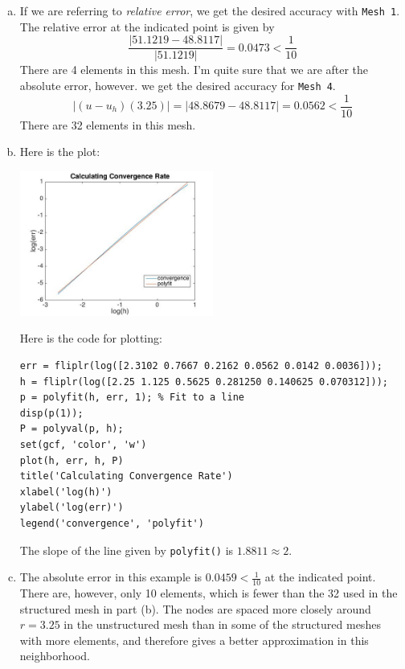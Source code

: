 \documentclass[11pt]{article}
\begin{document}
\begin{enumerate}[(a)]
\item If we are referring to \emph{relative error}, we get the desired accuracy with \texttt{Mesh 1}. The relative error at the indicated point is given by 
\begin{equation*}
\frac{|51.1219 - 48.8117|}{|51.1219|} = 0.0473 < \frac1{10}
\end{equation*}
There are 4 elements in this mesh. I'm quite sure that we are after the absolute error, however. we get the desired accuracy for \texttt{Mesh 4}.
\begin{equation*}
|(u - u_h)(3.25)| = |48.8679 - 48.8117| = 0.0562 < \frac1{10}
\end{equation*}
There are 32 elements in this mesh.
\item Here is the plot:
\begin{center}
\includegraphics[width=0.5\textwidth]{prob12b.jpg}
\end{center}
Here is the code for plotting:
\begin{lstlisting}
err = fliplr(log([2.3102 0.7667 0.2162 0.0562 0.0142 0.0036]));
h = fliplr(log([2.25 1.125 0.5625 0.281250 0.140625 0.070312]));
p = polyfit(h, err, 1); % Fit to a line
disp(p(1));
P = polyval(p, h);
set(gcf, 'color', 'w')
plot(h, err, h, P)
title('Calculating Convergence Rate')
xlabel('log(h)')
ylabel('log(err)')
legend('convergence', 'polyfit')
\end{lstlisting}

The slope of the line given by \texttt{polyfit()} is $1.8811 \approx 2$.	

\item The absolute error in this example is $0.0459 < \frac1{10}$ at the indicated point. There are, however, only 10 elements, which is fewer than the 32 used in the structured mesh in part (b). The nodes are spaced more closely around $r = 3.25$ in the unstructured mesh than in some of the structured meshes with more elements, and therefore gives a better approximation in this neighborhood. 


\end{enumerate}
\end{document}
